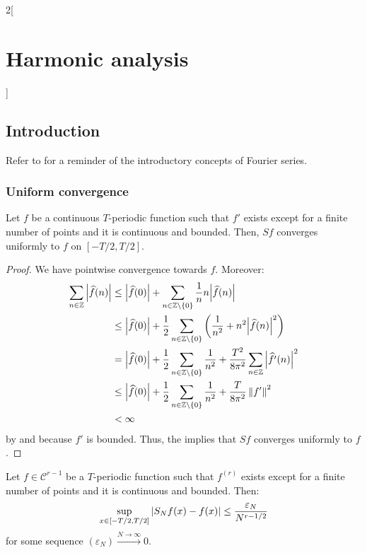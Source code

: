 \documentclass[../../../main_math.tex]{subfiles}
\begin{document}
\begin{multicols}{2}[\section{Harmonic analysis}]
  \subsection{Introduction}
  Refer to  for a reminder of the introductory concepts of Fourier series.
  \subsubsection{Uniform convergence}
  \begin{theorem}
    Let $f$ be a continuous $T$-periodic function such that $f'$ exists except for a finite number of points and it is continuous and bounded. Then, $Sf$ converges uniformly to $f$ on $[-T/2,T/2]$.
  \end{theorem}
  \begin{proof}
    We have pointwise convergence towards $f$. Moreover:
    \begin{align*}
      \sum_{n\in\mathbb{Z}}\abs{\widehat{f}(n)} & \leq\abs{\widehat{f}(0)}+ \sum_{n\in\mathbb{Z}\setminus\{0\}}\frac{1}{n}n\abs{\widehat{f}(n)}                                             \\
                                         & \leq\abs{\widehat{f}(0)}+\frac{1}{2}\sum_{n\in\mathbb{Z}\setminus\{0\}}\left(\frac{1}{n^2} + n^2\abs{\widehat{f}(n)}^2\right)             \\
                                         & =\abs{\widehat{f}(0)}+\frac{1}{2}\sum_{n\in\mathbb{Z}\setminus\{0\}}\frac{1}{n^2}+\frac{T^2}{8\pi^2}\sum_{n\in\mathbb{Z}}\abs{\widehat{f'}(n)}^2 \\
                                         & \leq\abs{\widehat{f}(0)}+\frac{1}{2}\sum_{n\in\mathbb{Z}\setminus\{0\}}\frac{1}{n^2}+\frac{T}{8\pi^2}\left\|f'\right\|^2                          \\
                                         & <\infty
    \end{align*}
    by  and because $f'$ is bounded. Thus, the  implies that $Sf$ converges uniformly to $f$.
  \end{proof}
  \begin{corollary}
    Let $f\in\mathcal{C}^{r-1}$ be a $T$-periodic function such that $f^{(r)}$ exists except for a finite number of points and it is continuous and bounded. Then: $$\sup_{x\in[-T/2,T/2]}\abs{S_Nf(x)-f(x)}\leq \frac{\varepsilon_N}{N^{r-1/2}}$$ for some sequence $(\varepsilon_N)\overset{N\to\infty}{\longrightarrow}0$.

\end{corollary}
\end{multicols}
\end{document}

